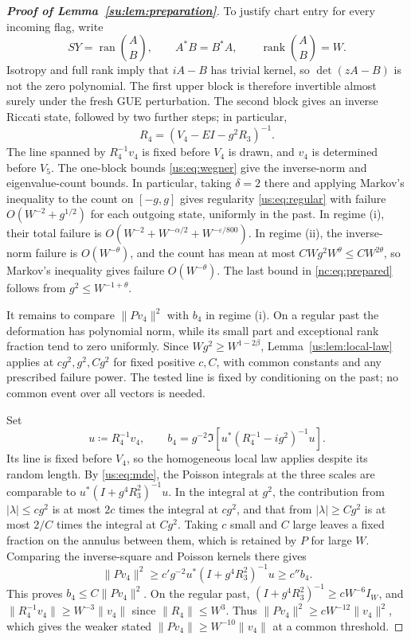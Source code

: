 \documentclass[11pt]{article}
\numberwithin{equation}{section}
\theoremstyle{remark}
\newcommand{\rank}{\operatorname{rank}}
\newcommand{\ran}{\operatorname{ran}}
\begin{document}
\begin{proof}[\textbf{Proof of Lemma~\ref{su:lem:preparation}}]
To justify chart entry for every incoming flag, write
\[
 SY=\ran\binom AB,\qquad A^*B=B^*A,\qquad \rank\binom AB=W.
\]
Isotropy and full rank imply that $iA-B$ has trivial kernel, so
$\det(zA-B)$ is not the zero polynomial. The first upper block is
therefore invertible almost surely under the fresh GUE perturbation.
The second block gives an inverse Riccati state, followed by two
further steps; in particular,
\[
 R_4=(V_4-EI-g^2R_3)^{-1}.
\]
The line spanned by $R_4^{-1}v_4$ is fixed before $V_4$ is drawn, and
$v_4$ is determined before $V_5$. The one-block bounds
\eqref{us:eq:wegner} give the inverse-norm and eigenvalue-count bounds.
In particular, taking $\delta=2$ there and applying Markov's inequality
to the count on $[-g,g]$ gives regularity \eqref{us:eq:regular} with
failure $O(W^{-2}+g^{1/2})$ for each outgoing state, uniformly in the past.
In regime (i), their total failure is
$O(W^{-2}+W^{-\alpha/2}+W^{-\varepsilon/800})$.
In regime (ii), the inverse-norm failure is $O(W^{-\theta})$, and the
count has mean at most $CWg^2W^\theta\le CW^{2\theta}$, so Markov's
inequality gives failure $O(W^{-\theta})$. The last bound in
\eqref{nc:eq:prepared} follows from $g^2\le W^{-1+\theta}$.

It remains to compare $\|Pv_4\|^2$ with $b_4$ in regime (i).
On a regular past the deformation has polynomial norm, while its small
part and exceptional rank fraction tend to zero uniformly. Since
$Wg^2\ge W^{1-2\beta}$, Lemma~\ref{us:lem:local-law} applies at
$cg^2,g^2,Cg^2$ for fixed positive $c,C$, with common constants and any
prescribed failure power. The tested line is fixed by conditioning on
the past; no common event over all vectors is needed.

Set
\[
 u\coloneqq R_4^{-1}v_4,\qquad
 b_4=g^{-2}\Im\!\left[u^*(R_4^{-1}-ig^2)^{-1}u\right].
\]
Its line is fixed before $V_4$, so the homogeneous local law applies
despite its random length. By \eqref{us:eq:mde}, the Poisson integrals
at the three scales are comparable to
$u^*(I+g^4R_3^2)^{-1}u$. In the integral at $g^2$, the contribution
from $|\lambda|\le cg^2$ is at most $2c$ times the integral at $cg^2$,
and that from $|\lambda|\ge Cg^2$ is at most $2/C$ times the integral
at $Cg^2$. Taking $c$ small and $C$ large leaves a fixed fraction on
the annulus between them, which is retained by $P$ for large $W$.
Comparing the inverse-square and Poisson kernels there gives
\[
 \|Pv_4\|^2\ge c'g^{-2}u^*(I+g^4R_3^2)^{-1}u\ge c''b_4.
\]
This proves $b_4\le C\|Pv_4\|^2$. On the regular past,
$(I+g^4R_3^2)^{-1}\ge cW^{-6}I_W$, and
$\|R_4^{-1}v_4\|\ge W^{-3}\|v_4\|$ since $\|R_4\|\le W^3$.
Thus $\|Pv_4\|^2\ge cW^{-12}\|v_4\|^2$, which gives the weaker stated
$\|Pv_4\|\ge W^{-10}\|v_4\|$ at a common threshold.

\end{proof}
\end{document}
